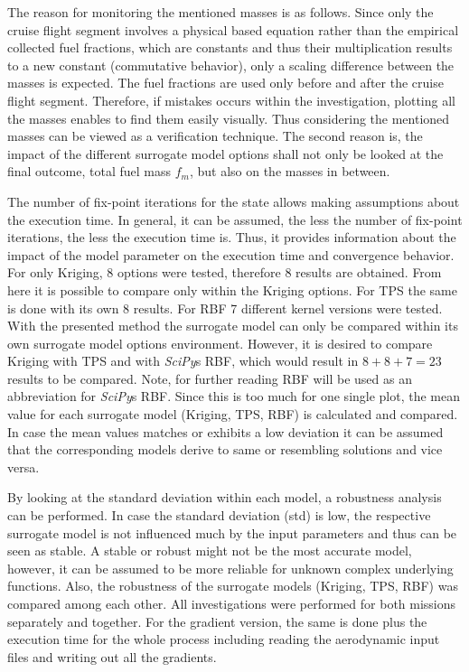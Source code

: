 The reason for monitoring 
the mentioned masses is as follows. Since 
only the cruise flight segment involves 
a physical based equation rather 
than the empirical collected fuel fractions, which 
are constants and thus 
their multiplication results to a 
new constant (commutative behavior), 
only a scaling difference between 
the masses is expected. The fuel 
fractions are used only before and after 
the cruise flight segment. Therefore, 
if mistakes occurs within the investigation, 
plotting all the masses enables to find 
them easily visually. Thus considering the
mentioned masses can be viewed as a 
verification technique. The second 
reason is, the impact of the different 
surrogate model options shall not 
only be looked at the final outcome, 
total fuel mass $f_m$, but also on 
the masses in between. \newline 

The number of fix-point iterations 
for the state allows making 
assumptions about the execution time. 
In general, it can be assumed, the less 
the number of fix-point iterations, the 
less the execution time is. Thus, it 
provides information about the impact 
of the model parameter on the execution time
and convergence behavior. For only Kriging,
8 options were tested, therefore 8 results 
are obtained. From here it is possible to 
compare only within the Kriging options.
For TPS the same is done with its 
own 8 results. For RBF 7 different
kernel versions were tested. With the 
presented method the surrogate 
model can only be compared within its 
own surrogate model options environment.
However, it is desired 
to compare Kriging with TPS and with 
\emph{SciPy}s RBF, which would result in $8+8+7 = 23$ results 
to be compared. Note, for 
further reading RBF will be used 
as an abbreviation for \emph{SciPy}s RBF. 
Since this is too much for one 
single plot, the mean value for
each surrogate model (Kriging, TPS, RBF) is 
calculated and compared. In case 
the mean values matches or exhibits 
a low deviation it can be assumed that 
the corresponding models derive to 
same or resembling solutions and vice versa. \newline


By looking at the standard deviation within 
each model, a robustness analysis 
can be performed. In case the standard deviation (std) 
is low, the respective surrogate model is not influenced much 
by the input parameters and thus can be 
seen as stable. A stable or robust 
might not be the most accurate model, however,
it can be assumed to be more reliable for 
unknown complex underlying functions. Also, 
the robustness of the surrogate models 
(Kriging, TPS, RBF) was compared among 
each other.
All investigations were performed for both missions 
separately and together.
For the gradient
version, the same is done plus the 
execution time for the whole process including 
reading the aerodynamic input files and 
writing out all the gradients.\newline

